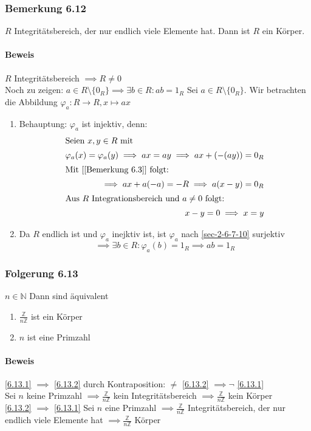 \documentclass[a4paper]{scrartcl}
\theoremstyle{definition}
\theoremstyle{plain}
\theoremstyle{plain}
\theoremstyle{remark}
\theoremstyle{remark}
\theoremstyle{remark}
\theoremstyle{remark}
\theoremstyle{remark}
\begin{document}
\subsubsection{Bemerkung 6.12}
\label{sec-3-3-3}
$R$ Integritätsbereich, der nur endlich viele Elemente hat. Dann ist $R$ ein Körper.
\paragraph{Beweis}
\label{sec-3-3-3-1}
$R$ Integritätsbereich $\implies R\neq 0$ \\
     Noch zu zeigen: $a\in R\setminus\{0_R\} \implies \exists b\in R: a b = 1_R$
Sei $a\in R\setminus\{0_R\}$. Wir betrachten die Abbildung $\varphi_a: R\to R,x\mapsto a x$
\begin{enumerate}
\item Behauptung: $\varphi_a$ ist injektiv, denn:
\begin{align}
\intertext{Seien $x,y\in R$ mit}
\varphi_a(x) =\varphi_a(y) \implies a x = a y \implies a x + (-(a y)) = 0_R \\
\intertext{Mit [[Bemerkung 6.3]] folgt:}
\implies a x + a(-a) = -R \implies a(x - y) = 0_R  \\
\intertext{Aus $R$ Integrationsbereich und $a\neq 0$ folgt:}
x - y = 0 \implies x = y
\end{align}
\item Da $R$ endlich ist und $\varphi_a$ inejktiv ist, ist $\varphi_a$ nach \ref{sec-2-6-7-10} surjektiv
\[\implies  \exists b\in R: \varphi_a(b) = 1_R \implies a b = 1_R\]
\end{enumerate}
\subsubsection{Folgerung 6.13}
\label{sec-3-3-4}
$n\in\mathbb{N}$ Dann sind äquivalent
\begin{enumerate}
\item \label{6.13.1} $\frac{\mathbb{Z}}{n\mathbb{Z}}$ ist ein Körper
\item \label{6.13.2} $n$ ist eine Primzahl
\end{enumerate}
\paragraph{Beweis}
\label{sec-3-3-4-1}
\ref{6.13.1} $\implies$ \ref{6.13.2} durch Kontraposition: $\neq$ \ref{6.13.2} $\implies \neg$ \ref{6.13.1} \\
     Sei $n$ keine Primzahl $\implies \frac{\mathbb{Z}}{n\mathbb{Z}}$ kein Integritätsbereich $\implies \frac{\mathbb{Z}}{n\mathbb{Z}}$ kein Körper \\
     \ref{6.13.2} $\implies$ \ref{6.13.1} Sei $n$ eine Primzahl $\implies \frac{\mathbb{Z}}{n\mathbb{Z}}$ Integritätsbereich, der nur endlich viele Elemente hat $\implies \frac{\mathbb{Z}}{n\mathbb{Z}}$ Körper
\end{document}
